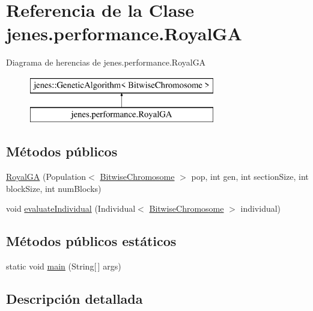 \hypertarget{classjenes_1_1performance_1_1_royal_g_a}{\section{Referencia de la Clase jenes.\-performance.\-Royal\-G\-A}
\label{classjenes_1_1performance_1_1_royal_g_a}
}
Diagrama de herencias de jenes.\-performance.\-Royal\-G\-A\begin{figure}[H]
\begin{center}
\leavevmode
\includegraphics[height=2.000000cm]{classjenes_1_1performance_1_1_royal_g_a}
\end{center}
\end{figure}
\subsection*{Métodos públicos}
\begin{DoxyCompactItemize}
\item 
\hyperlink{classjenes_1_1performance_1_1_royal_g_a_a6e77c8bfb3b7851b2e78dc907038d557}{Royal\-G\-A} (Population$<$ \hyperlink{classjenes_1_1chromosome_1_1_bitwise_chromosome}{Bitwise\-Chromosome} $>$ pop, int gen, int section\-Size, int block\-Size, int num\-Blocks)
\item 
void \hyperlink{classjenes_1_1performance_1_1_royal_g_a_ad135a4f53db8dcf6972681a8a1ab6f43}{evaluate\-Individual} (Individual$<$ \hyperlink{classjenes_1_1chromosome_1_1_bitwise_chromosome}{Bitwise\-Chromosome} $>$ individual)
\end{DoxyCompactItemize}
\subsection*{Métodos públicos estáticos}
\begin{DoxyCompactItemize}
\item 
static void \hyperlink{classjenes_1_1performance_1_1_royal_g_a_a594d9cdab2d9779ea59a67bf67c47e7d}{main} (String\mbox{[}$\,$\mbox{]} args)
\end{DoxyCompactItemize}


\subsection{Descripción detallada}


